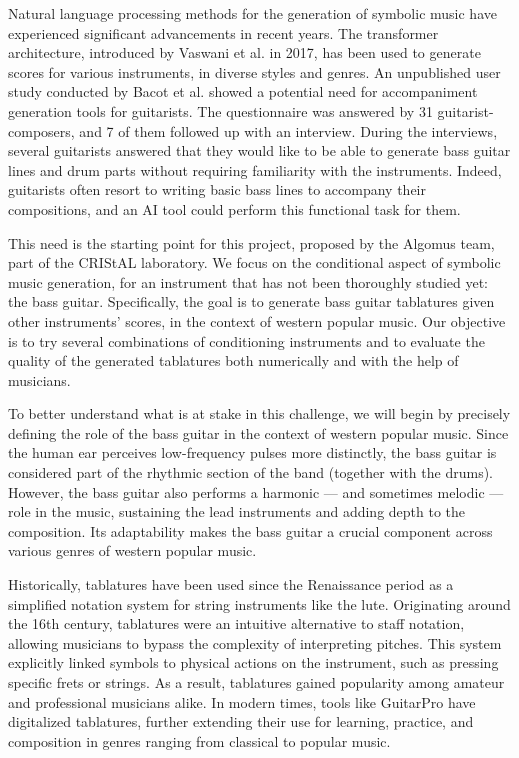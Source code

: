 Natural language processing methods for the generation of symbolic music have experienced significant advancements in recent years.
The transformer architecture, introduced by Vaswani et al. in 2017, has been used to generate scores for various instruments, in diverse styles and genres\cite{vaswani_attention_2023, le_natural_2024}.
An unpublished user study conducted by Bacot et al. showed a potential need for accompaniment generation tools for guitarists.
The questionnaire was answered by 31 guitarist-composers, and 7 of them followed up with an interview.
During the interviews, several guitarists answered that they would like to be able to generate bass guitar lines and drum parts without requiring familiarity with the instruments.
Indeed, guitarists often resort to writing basic bass lines to accompany their compositions, and an AI tool could perform this functional task for them\cite{bacot_tablature_2025}.

This need is the starting point for this project, proposed by the Algomus team, part of the CRIStAL laboratory.
We focus on the conditional aspect of symbolic music generation, for an instrument that has not been thoroughly studied yet: the bass guitar.
Specifically, the goal is to generate bass guitar tablatures given other instruments' scores, in the context of western popular music.
Our objective is to try several combinations of conditioning instruments and to evaluate the quality of the generated tablatures both numerically and with the help of musicians.


To better understand what is at stake in this challenge, we will begin by precisely defining the role of the bass guitar in the context of western popular music.
Since the human ear perceives low-frequency pulses more distinctly, the bass guitar is considered part of the rhythmic section of the band (together with the drums)\cite{hove_superior_2014}.
However, the bass guitar also performs a harmonic — and sometimes melodic — role in the music, sustaining the lead instruments and adding depth to the composition.
Its adaptability makes the bass guitar a crucial component across various genres of western popular music.


Historically, tablatures have been used since the Renaissance period as a simplified notation system for string instruments like the lute.
Originating around the 16th century, tablatures were an intuitive alternative to staff notation, allowing musicians to bypass the complexity of interpreting pitches.
This system explicitly linked symbols to physical actions on the instrument, such as pressing specific frets or strings.
As a result, tablatures gained popularity among amateur and professional musicians alike.
In modern times, tools like GuitarPro have digitalized tablatures, further extending their use for learning, practice, and composition in genres ranging from classical to popular music\cite{sarmento_dadagp_2021}.

